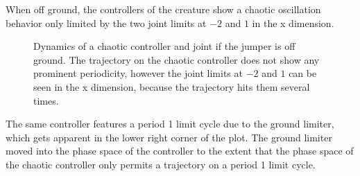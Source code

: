 \documentclass[main]{subfiles}
\begin{document}
When off ground, the controllers of the creature show a chaotic oscillation behavior only limited by the two joint limits at \(-2\) and \(1\) in the x dimension. %

\begin{figure}[H]
\centering
	\begin{minipage}{1.3\textwidth}
	\hspace*{-5em}
	\end{minipage}
\caption[Off ground controller dynamics of the crawler]{Dynamics of a chaotic controller and joint if the jumper is off ground. The trajectory on the chaotic controller does not show any prominent periodicity, however the joint limits at \(-2\) and \(1\) can be seen in the x dimension, because the trajectory hits them several times.}
\label{figure:crawler1-off-ground-controller-dynamics}
\end{figure}

The same controller features a period 1 limit cycle due to the ground limiter, which gets apparent in the lower right corner of the plot. %
%
The ground limiter moved into the phase space of the controller to the extent that the phase space of the chaotic controller only permits a trajectory on a period 1 limit cycle. %
\end{document}
